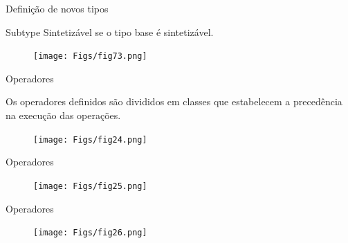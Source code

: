 \documentclass[aspectratio=169]{beamer}
\begin{document}
\begin{frame}{Definição de novos tipos}
	\justifying
	
	\begin{block}{Subtype}
		\justifying
		Sintetizável se o tipo base é sintetizável.
	\end{block}		
	
	\begin{figure}[h]
		\centering
		\texttt{[image: Figs/fig73.png]}
	\end{figure}
	
\end{frame}
\begin{frame}{Operadores}
	\justifying
	
	\begin{block}{}
		\justifying
		Os operadores definidos são divididos em classes que estabelecem a precedência na execução das operações.
	\end{block}		
	
	\begin{figure}[h]
		\centering
		\texttt{[image: Figs/fig24.png]}
	\end{figure}
	
	
\end{frame}
\begin{frame}{Operadores}
	\justifying
	
	
	\begin{figure}[h]
		\centering
		\texttt{[image: Figs/fig25.png]}
	\end{figure}
	
	
\end{frame}
\begin{frame}{Operadores}
	\justifying
	
	
	\begin{figure}[h]
		\centering
		\texttt{[image: Figs/fig26.png]}
	\end{figure}
	
	
\end{frame}
\end{document}
